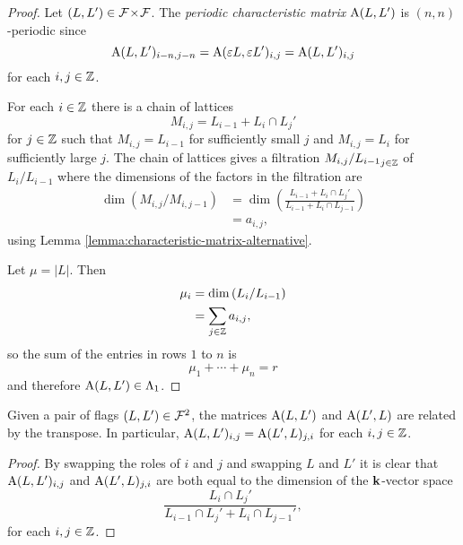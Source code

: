 \documentclass[a4paper, 11pt, twoside]{report}
\begin{document}
\begin{proof}
Let $(L,L')\in{\mathcal{F}\!\times\!\mathcal{F}}$. The \emph{periodic characteristic matrix} $\operatorname{A}(L,L')$ is $(n,n)$-periodic since
\begin{equation*}
\operatorname{A}(L,L')_{i-n,j-n} = \operatorname{A}(\varepsilon L,\varepsilon L')_{i,j} = \operatorname{A}(L,L')_{i,j}
\end{equation*}
for each $i,j\in\mathbb{Z}$.

For each $i\in\mathbb{Z}$ there is a chain of lattices
\begin{equation*}
M_{i,j} = L_{i-1} + L_i\cap L_j'
\end{equation*}
for $j\in\mathbb{Z}$ such that $M_{i,j}=L_{i-1}$ for sufficiently small $j$ and $M_{i,j}=L_i$ for sufficiently large $j$. The chain of lattices gives a filtration $M_{i,j}/{L_{i-1}}_{j\in\mathbb{Z}}$ of $L_i/{L_{i-1}}$ where the dimensions of the factors in the filtration are
\begin{align*}
\dim\left(M_{i,j}/{M_{i,j-1}}\right)
&= \dim\left(\frac{L_{i-1} + L_i\cap L_j'}{L_{i-1} + L_i\cap L_{j-1}}\right)\\
&= a_{i,j},
\end{align*}
using Lemma \ref{lemma:characteristic-matrix-alternative}.

Let $\mu=|L|$. Then
\begin{align*}
\mu_i
&= \dim\left(L_i/{L_{i-1}}\right)\\
&= \sum_{j\in\mathbb{Z}} a_{i,j},
\end{align*}
so the sum of the entries in rows $1$ to $n$ is
\begin{equation*}
\mu_1+\cdots +\mu_n = r
\end{equation*}
and therefore $\operatorname{A}(L,L')\in\Lambda_1{}$.
\end{proof}

\begin{lemma}\label{lemma:transpose-orbit}
Given a pair of flags $(L,L')\in\mathcal{F}^2$, the matrices $\operatorname{A}(L,L')$ and $\operatorname{A}(L',L)$ are related by the transpose. In particular, $\operatorname{A}(L,L')_{i,j} = \operatorname{A}(L',L)_{j,i}$ for each $i,j\in\mathbb{Z}$.
\end{lemma}

\begin{proof}
By swapping the roles of $i$ and $j$ and swapping $L$ and $L'$ it is clear that $\operatorname{A}(L,L')_{i,j}$ and $\operatorname{A}(L',L)_{j,i}$ are both equal to the dimension of the $\mathbf{k}$-vector space
\begin{equation*}
\frac{L_i\cap L_j'}{L_{i-1}\cap L_j' + L_i\cap L_{j-1}'},
\end{equation*}
for each $i,j\in\mathbb{Z}$.
\end{proof}
\end{document}

